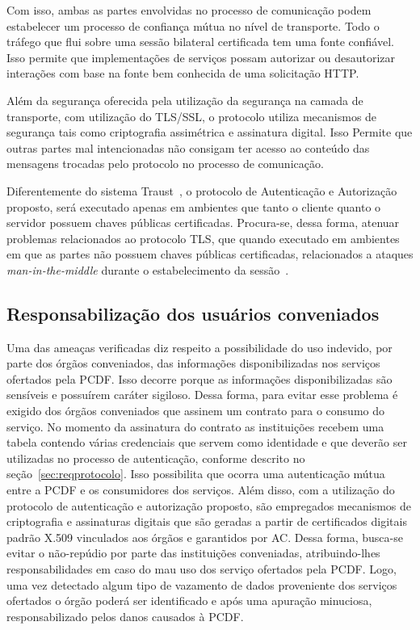 Com isso, ambas as partes envolvidas no processo de comunicação podem estabelecer um processo de confiança mútua no nível de transporte. Todo o tráfego que flui sobre uma sessão bilateral certificada tem uma fonte confiável. Isso permite que implementações de serviços possam autorizar ou desautorizar interações com base na fonte bem conhecida de uma solicitação HTTP.

Além da segurança oferecida pela utilização da segurança na camada de transporte, com utilização do TLS/SSL, o protocolo utiliza mecanismos de segurança tais como 
criptografia assimétrica e assinatura digital. Isso Permite que outras partes mal intencionadas não consigam ter acesso ao conteúdo das mensagens trocadas pelo protocolo 
no processo de comunicação.

Diferentemente do sistema Traust~\cite{traust08}, o protocolo de Autenticação e Autorização proposto, será executado apenas em ambientes que tanto o cliente quanto o servidor possuem chaves públicas certificadas. Procura-se, dessa forma, atenuar problemas relacionados ao protocolo TLS, que quando executado em ambientes em que as partes 
n\~{a}o possuem chaves públicas certificadas, relacionados a ataques \emph{man-in-the-middle} durante o estabelecimento da sessão~\cite{traust08}.

\subsection{Responsabilização dos usuários conveniados}

Uma das ameaças verificadas diz respeito a possibilidade do uso indevido, por parte dos órgãos conveniados, das informações disponibilizadas nos serviços ofertados pela PCDF. Isso decorre porque as informações disponibilizadas s\~{a}o sensíveis e possuírem caráter sigiloso. Dessa forma, para evitar esse problema é exigido dos órgãos conveniados que assinem um contrato para o consumo do serviço. No momento da assinatura do contrato as institui\c c\~{o}es recebem uma tabela contendo várias credenciais que servem como identidade e que deverão ser utilizadas no processo de autenticação, conforme descrito no seção~\ref{sec:reqprotocolo}. Isso possibilita que ocorra uma autenticação mútua entre a PCDF e os consumidores dos serviços. Além disso, com a utilização do protocolo de autenticação e autorização proposto, são empregados mecanismos de criptografia e assinaturas digitais que são geradas a partir de certificados digitais padrão X.509 vinculados aos órgãos e garantidos por AC. Dessa forma, busca-se evitar o não-repúdio por parte das institui\c c\~{o}es conveniadas, 
atribuindo-lhes responsabilidades em caso do mau uso dos serviço ofertados pela PCDF. Logo, uma vez detectado algum tipo de vazamento de dados proveniente dos serviços ofertados o órgão poderá ser identificado e após uma apuração minuciosa, responsabilizado pelos danos causados à PCDF.

